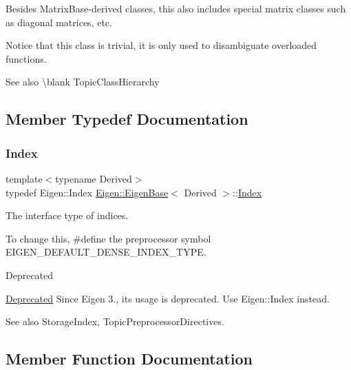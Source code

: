 Besides Matrix\+Base-\/derived classes, this also includes special matrix classes such as diagonal matrices, etc.

Notice that this class is trivial, it is only used to disambiguate overloaded functions.

\begin{DoxySeeAlso}{See also}
\textbackslash{}blank Topic\+Class\+Hierarchy 
\end{DoxySeeAlso}


\subsection{Member Typedef Documentation}
\mbox{\label{struct_eigen_1_1_eigen_base_a554f30542cc2316add4b1ea0a492ff02}} 
\subsubsection{\texorpdfstring{Index}{Index}}
{\footnotesize\ttfamily template$<$typename Derived$>$ \\
typedef Eigen\+::\+Index \mbox{\hyperlink{struct_eigen_1_1_eigen_base}{Eigen\+::\+Eigen\+Base}}$<$ Derived $>$\+::\mbox{\hyperlink{struct_eigen_1_1_eigen_base_a554f30542cc2316add4b1ea0a492ff02}{Index}}}



The interface type of indices. 

To change this, {\ttfamily \#define} the preprocessor symbol {\ttfamily E\+I\+G\+E\+N\+\_\+\+D\+E\+F\+A\+U\+L\+T\+\_\+\+D\+E\+N\+S\+E\+\_\+\+I\+N\+D\+E\+X\+\_\+\+T\+Y\+PE}. \begin{DoxyRefDesc}{Deprecated}
\item[\mbox{\hyperlink{deprecated__deprecated000006}{Deprecated}}]Since Eigen 3., its usage is deprecated. Use Eigen\+::\+Index instead. \end{DoxyRefDesc}
\begin{DoxySeeAlso}{See also}
Storage\+Index, Topic\+Preprocessor\+Directives. 
\end{DoxySeeAlso}


\subsection{Member Function Documentation}
\mbox{\label{struct_eigen_1_1_eigen_base_a7b0b45c7351847696c911ce8aa2abbdb}} 
